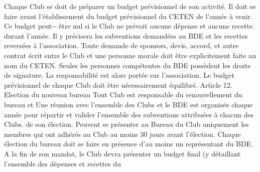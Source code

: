 \documentclass{article} %
\begin{document}
\begin{multicols}{2}
Chaque  Club  se  doit  de  préparer  un  budget  prévisionnel  de   son  activité.  Il  doit  se  faire  avant  l’établissement  du  budget   prévisionnel  du  CETEN  de  l’année  à  venir.  Ce  budget  peut-­‐ être   nul   si   le   Club   ne   prévoit   aucune   dépense   et   aucune   recette   durant   l’année.   Il   y   précisera   les   subventions   demandées  au  BDE  et  les  recettes  reversées  à  l’association.  
Toute  demande  de  sponsors,  devis,  accord,  et  autre  contrat   écrit   entre   le   Club   et   une   personne   morale   doit   être   explicitement  faite  au  nom  du  CETEN.  Seules  les  personnes   compétentes   du   BDE   possèdent   les   droits   de   signature.   La   responsabilité  est  alors  portée  sur  l’association.  
Le   budget   prévisionnel   de   chaque   Club   doit   être   nécessairement  équilibré.  
Article  12. Election  du  nouveau  bureau   Tout  Club  est  responsable  du  renouvellement  du  bureau  et  
Une   réunion   avec   l’ensemble   des   Clubs   et   le   BDE   est   organisée  chaque  année  pour  répartir  et  valider  l’ensemble   des  subventions  attribuées  à  chacun  des  Clubs.  
de   son   élection.   Peuvent   se   présenter   au   Bureau   du   Club   uniquement  les  membres  qui  ont  adhérés  au  Club  au  moins   30  jours  avant  l’élection.  Chaque  élection  du  bureau  doit  se   faire  en  présence  d’au  moins  un  représentant  du  BDE.  
A  la  fin  de  son  mandat,  le  Club  devra  présenter  un  budget   final  (y  détaillant  l’ensemble  des  dépenses  et  recettes  du
  

\end{multicols}
\end{document}

